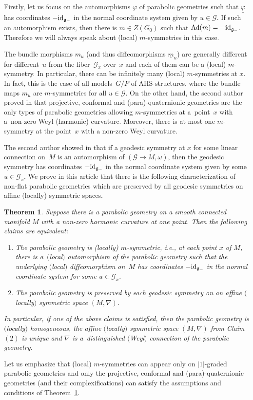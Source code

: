 \documentclass[10pt,a4paper]{amsart}
\newcommand{\om}{\omega}
\newcommand{\un}{\underline}
\newcommand{\ba}{\mathcal{G}}
\newcommand{\fg}{\mathfrak g}
\newcommand{\Ad}{{\rm Ad}}
\newcommand{\id}{{\rm id}}
\numberwithin{equation}{section}
\newtheorem{Theorem}{Theorem}[section]
\begin{document}
Firstly, let us focus on the automorphisms $\varphi$ of parabolic geometries such that $\un{\varphi}$ has coordinates $-\id_{\fg_-}$ in the normal coordinate system given by $u\in \ba$. If such an automorphism exists, then there is $m\in Z(G_0)$ such that $\Ad(m)=-\id_{\fg_-}$. Therefore we will always speak about (local) $m$-symmetries in this case.

The bundle morphisms $m_u$ (and thus dif\/feomorphisms $\underline{m}_u$) are generally dif\/ferent for dif\/fe\-rent~$u$ from the f\/iber~$\ba_x$ over~$x$ and each of them can be a (local) $m$-symmetry. In particular, there can be inf\/initely many (local) $m$-symmetries at $x$. In fact, this is the case of all mo\-dels~$G/P$ of AHS-structures, where the bundle maps $m_u$ are $m$-symmetries for all $u\in \ba$. On the other hand, the second author proved in \cite[Theorem 2.5]{LZ1} that projective, conformal and (para)-quaternionic geometries are the only types of parabolic geometries allowing $m$-symmetries at a~point~$x$ with a~non-zero Weyl (harmonic) curvature. Moreover, there is at most one $m$-symmetry at the point~$x$ with a non-zero Weyl curvature.

The second author showed in \cite[Theorem~3.2]{LZ1} that if a geodesic symmetry at $x$ for some linear connection on~$M$ is an automorphism of $(\ba\to M,\om)$, then the geodesic symmetry has coordinates $-\id_{\fg_-}$ in the normal coordinate system given by some $u\in \ba_x$. We prove in this article that there is the following characterization of non-f\/lat parabolic geometries which are preserved by all geodesic symmetries on af\/f\/ine (locally) symmetric spaces.

\begin{Theorem}\label{t1.1}
Suppose there is a parabolic geometry on a smooth connected manifold $M$ with a non-zero harmonic curvature at one point. Then the following claims are equivalent:
\begin{enumerate}\itemsep=0pt
\item[$1.$] The parabolic geometry is (locally) $m$-symmetric, i.e., at each point $x$ of $M$, there is a~$($local$)$ automorphism of the parabolic geometry such that the underlying $($local$)$ diffeomorphism on~$M$ has coordinates $-\id_{\fg_-}$ in the normal coordinate system for some $u\in \ba_x$.
\item[$2.$] The parabolic geometry is preserved by each geodesic symmetry on an affine $($locally$)$ symmetric space $(M,\nabla)$.
\end{enumerate}

In particular, if one of the above claims is satisfied, then the parabolic geometry is $($locally$)$ homogeneous, the affine $($locally$)$ symmetric space $(M,\nabla)$ from Claim~$(2)$ is unique and $\nabla$ is a~distinguished $($Weyl$)$ connection of the parabolic geometry.
\end{Theorem}
\begin{Remark}
Let us emphasize that (local) $m$-symmetries can appear only on $|1|$-graded parabolic geometries and only the projective, conformal and (para)-quaternionic geometries (and their complexif\/ications) can satisfy the assumptions and conditions of Theorem~\ref{t1.1}.
\end{Remark}
\end{document}
